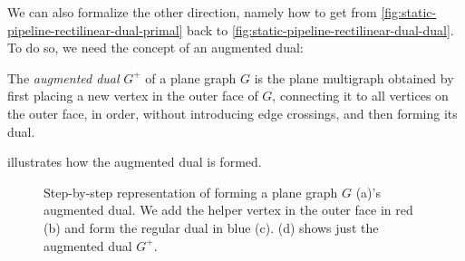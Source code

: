 We can also formalize the other direction, namely how to get from \cref{fig:static-pipeline-rectilinear-dual-primal} back to \cref{fig:static-pipeline-rectilinear-dual-dual}. To do so, we need the concept of an augmented dual:
%
\begin{definition}
	The \emph{augmented dual} $G^+$ of a plane graph $G$ is the plane multigraph obtained by first placing a new vertex in the outer face of $G$, connecting it to all vertices on the outer face, in order, without introducing edge crossings, and then forming its dual.
\end{definition}

 illustrates how the augmented dual is formed.
%
\begin{figure}[H]
	\centering
	\quad
	\quad
	\quad
	\caption{Step-by-step representation of forming a plane graph $G$ (a)'s augmented dual. We add the helper vertex in the outer face in red (b) and form the regular dual in blue (c). (d) shows just the augmented dual $G^+$.}
	\label{fig:static-pipeline-augmented-dual}
\end{figure}

